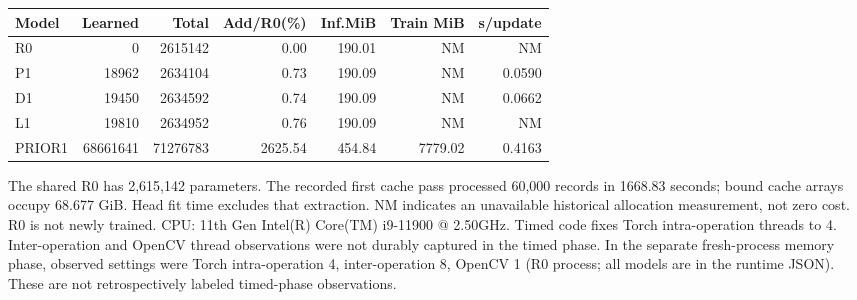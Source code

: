 \begin{longtable}{lrrrrrr}\toprule Model & Learned & Total & Add/R0(\%) & Inf.MiB & Train MiB & s/update\\\midrule
R0 & 0 & 2615142 & 0.00 & 190.01 & NM & NM \\
P1 & 18962 & 2634104 & 0.73 & 190.09 & NM & 0.0590 \\
D1 & 19450 & 2634592 & 0.74 & 190.09 & NM & 0.0662 \\
L1 & 19810 & 2634952 & 0.76 & 190.09 & NM & NM \\
PRIOR1 & 68661641 & 71276783 & 2625.54 & 454.84 & 7779.02 & 0.4163 \\
\bottomrule\end{longtable}
The shared R0 has 2,615,142 parameters. The recorded first cache pass processed 60,000 records in 1668.83 seconds; bound cache arrays occupy 68.677 GiB. Head fit time excludes that extraction. NM indicates an unavailable historical allocation measurement, not zero cost. R0 is not newly trained.
CPU: 11th Gen Intel(R) Core(TM) i9-11900 @ 2.50GHz. Timed code fixes Torch intra-operation threads to 4. Inter-operation and OpenCV thread observations were not durably captured in the timed phase. In the separate fresh-process memory phase, observed settings were Torch intra-operation 4, inter-operation 8, OpenCV 1 (R0 process; all models are in the runtime JSON). These are not retrospectively labeled timed-phase observations.
